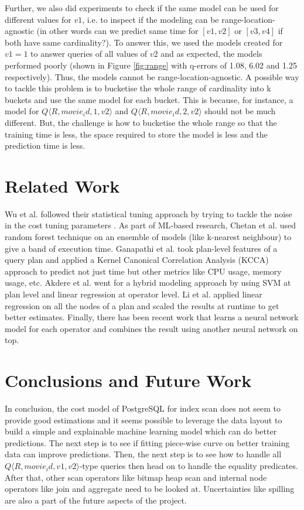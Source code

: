 \documentclass{article}
\begin{document}
\newpage
\begin{multicols}{2}
	Further, we also did experiments to check if the same model can be used for different values for $v1$, i.e. to inspect if the modeling can be range-location-agnostic (in other words can we predict same time for $[v1,v2]$ or $[v3,v4]$ if both have same cardinality?). To answer this, we used the models created for $v1 = 1$ to answer queries of all values of $v2$ and as expected, the models performed poorly (shown in Figure \ref{fig:range} with q-errors of 1.08, 6.02 and 1.25 respectively). Thus, the models cannot be range-location-agnostic. A possible way to tackle this problem is to bucketise the whole range of cardinality into k buckets and use the same model for each bucket. This is because, for instance, a model for $Q \langle R,movie_id,1,v2 \rangle $ and $Q \langle R,movie_id,2,v2 \rangle $ should not be much different. But, the challenge is how to bucketise the whole range so that the training time is less, the space required to store the model is less and the prediction time is less.
	\section{Related Work}
	\label{sec:relwork}
	Wu et al. followed their statistical tuning \cite{wu} approach by trying to tackle the noise in the cost tuning parameters \cite{wu_wu}. As part of ML-based research, Chetan et al. \cite{chetan} used random forest technique on an ensemble of models (like k-nearest neighbour) to give a band of execution time. Ganapathi et al. \cite{ganapathi} took plan-level features of a query plan and applied a Kernel Canonical Correlation Analysis (KCCA) approach to predict not just time but other metrics like CPU usage, memory usage, etc. Akdere et al. \cite{akdere} went for a hybrid modeling approach by using SVM at plan level and linear regression at operator level. Li et al. \cite{surajit} applied linear regression on all the nodes of a plan and scaled the results at runtime to get better estimates. Finally, there has been recent work \cite{marcus} that learns a neural network model for each operator and combines the result using another neural network on top.
	
	\section{Conclusions and Future Work}
	\label{sec:conclusions}
	In conclusion, the cost model of PostgreSQL for index scan does not seem to provide good estimations and it seems possible to leverage the data layout to build a simple and explainable machine learning model which can do better predictions. The next step is to see if fitting piece-wise curve on better training data can improve predictions. Then, the next step is to see how to handle all $Q \langle R,movie_id,v1,v2 \rangle $-type queries then head on to handle the equality predicates. After that, other scan operators like bitmap heap scan and internal node operators like join and aggregate need to be looked at. Uncertainties like spilling are also a part of the future aspects of the project.
	

\end{multicols}
\end{document}
